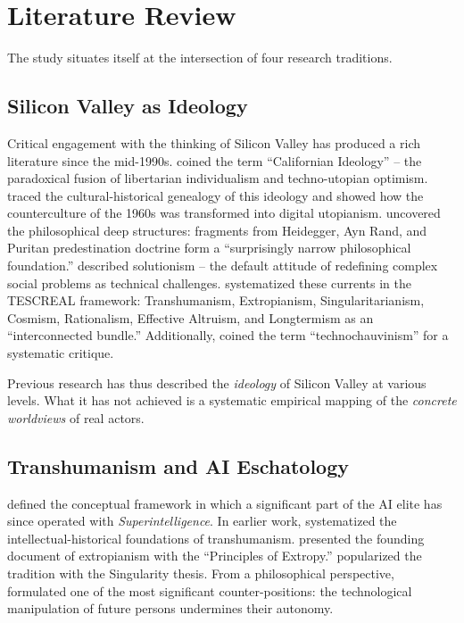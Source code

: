 \documentclass[12pt,a4paper]{article}
\begin{document}
\section{Literature Review}
\label{sec:forschungsstand}

The study situates itself at the intersection of four research traditions.

\subsection{Silicon Valley as Ideology}
\label{sec:forschungsstand:sv}

Critical engagement with the thinking of Silicon Valley has produced a rich literature since the mid-1990s. \citet{BarbCam1996} coined the term ``Californian Ideology'' -- the paradoxical fusion of libertarian individualism and techno-utopian optimism. \citet{Turner2006} traced the cultural-historical genealogy of this ideology and showed how the counterculture of the 1960s was transformed into digital utopianism. \citet{Daub2020} uncovered the philosophical deep structures: fragments from Heidegger, Ayn Rand, and Puritan predestination doctrine form a ``surprisingly narrow philosophical foundation.'' \citet{Morozov2013} described solutionism -- the default attitude of redefining complex social problems as technical challenges. \citet{TorresGebru2024} systematized these currents in the TESCREAL framework: Transhumanism, Extropianism, Singularitarianism, Cosmism, Rationalism, Effective Altruism, and Longtermism as an ``interconnected bundle.'' Additionally, \citet{Broussard2018} coined the term ``technochauvinism'' for a systematic critique.

Previous research has thus described the \emph{ideology} of Silicon Valley at various levels. What it has not achieved is a systematic empirical mapping of the \emph{concrete worldviews} of real actors.


\subsection{Transhumanism and AI Eschatology}
\label{sec:forschungsstand:transhumanismus}

\citet{Bostrom2014} defined the conceptual framework in which a significant part of the AI elite has since operated with \emph{Superintelligence}. In earlier work, \citet{Bostrom2005} systematized the intellectual-historical foundations of transhumanism. \citet{More2003} presented the founding document of extropianism with the ``Principles of Extropy.'' \citet{Kurzweil2005} popularized the tradition with the Singularity thesis. From a philosophical perspective, \citet{Habermas2001} formulated one of the most significant counter-positions: the technological manipulation of future persons undermines their autonomy.
\end{document}
